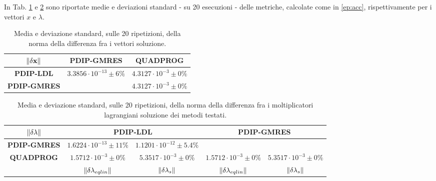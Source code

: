 In Tab. \ref{tab:normx} e \ref{tab:norml} sono riportate medie e deviazioni standard - su 20 esecuzioni - delle metriche, calcolate come in \ref{ep:acc}, rispettivamente per i vettori $x$ e $\lambda$.   

\begin{table}[!h]
\centering
\begin{tabular}{c|c|l|c}
$\mathbf{\left\lVert\delta x\right\rVert}$ & \multicolumn{2}{c|}{\textbf{PDIP-GMRES}}         & \textbf{QUADPROG}          \\ \hline
\textbf{PDIP-LDL}            & \multicolumn{2}{c|}{$3.3856\cdot10^{-13}\pm6\%$} & $4.3127\cdot10^{-3}\pm0\%$ \\ \hline
\textbf{PDIP-GMRES}          & \multicolumn{2}{c|}{}                            & $4.3127\cdot10^{-3}\pm0\%$
\end{tabular}
\caption{Media e deviazione standard, sulle 20 ripetizioni, della norma della differenza fra i vettori soluzione.\label{tab:normx}}
\end{table}

\begin{table}[!h]
\begin{tabular}{c|c|c|c|c|}
      $\mathbf{\left\lVert\delta\lambda\right\rVert}$             & \multicolumn{2}{c|}{\textbf{PDIP-LDL}}                                        & \multicolumn{2}{c|}{\textbf{PDIP-GMRES}}                                      \\ \hline
\textbf{PDIP-GMRES} & $1.6224\cdot10^{-13}\pm11\%$          & $1.1201\cdot10^{-12}\pm5.4\%$         & \multicolumn{2}{c|}{ }                                                        \\ 
\textbf{QUADPROG}   & $1.5712\cdot10^{-3}\pm0\%$            & $5.3517\cdot10^{-3}\pm0\%$            & $1.5712\cdot10^{-3}\pm0\%$            & $5.3517\cdot10^{{-3}}\pm0\%$          \\
                    & $\left\lVert \delta\lambda_{eqlin} \right\rVert$ & $\left\lVert \delta\lambda_{s} \right\rVert$ & $\left\lVert \delta\lambda_{eqlin} \right\rVert$ & $\left\lVert \delta\lambda_{s} \right\rVert$
\end{tabular}
\caption{Media e deviazione standard, sulle 20 ripetizioni, della norma della differenza fra i moltiplicatori lagrangiani soluzione dei metodi testati.\label{tab:norml}}
\end{table}

